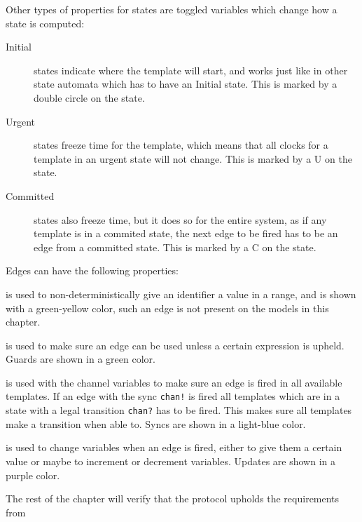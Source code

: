 \noindent
Other types of properties for states are toggled variables which change how a state is computed:

\begin{description}
	\item [Initial] states indicate where the template will start, and works just like in other state automata which has to have an Initial state. This is marked by a double circle on the state.
	\item [Urgent] states freeze time for the template, which means that all clocks for a template in an urgent state will not change. This is marked by a U on the state.
	\item [Committed] states also freeze time, but it does so for the entire system, as if any template is in a commited state, the next edge to be fired has to be an edge from a committed state. This is marked by a C on the state.
\end{description}

\noindent

Edges can have the following properties:

\begin{description}[labelindent=\parindent,labelsep=1ex]
    \item[Select] is used to non-deterministically give an identifier a value in a range, and is shown with a green-yellow color, such an edge is not present on the models in this chapter.
    \item[Guard] is used to make sure an edge can be used unless a certain expression is upheld. Guards are shown in a green color.
    \item[Sync] is used with the channel variables to make sure an edge is fired in all available templates. If an edge with the sync \texttt{chan!} is fired all templates which are in a state with a legal transition \texttt{chan?} has to be fired. This makes sure all templates make a transition when able to. Syncs are shown in a light-blue color.
    \item[Update] is used to change variables when an edge is fired, either to give them a certain value or maybe to increment or decrement variables. Updates are shown in a purple color.
\end{description}

\noindent
The rest of the chapter will verify that the protocol upholds the requirements from 
